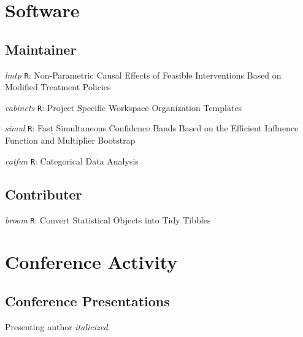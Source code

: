 \documentclass[12pt,letterpaper]{report}
\begin{document}
    \section*{Software}
    
    \subsection*{Maintainer}
    
    \begin{tablist}
    
    	\item[\textit{lmtp}] \tab \texttt{R}: Non-Parametric Causal Effects of Feasible Interventions Based on Modified Treatment Policies
	
	\item[\textit{cabinets}] \tab \texttt{R}: Project Specific Workspace Organization Templates
	
	\item[\textit{simul}] \tab \texttt{R}: Fast Simultaneous Confidence Bands Based on the Efficient Influence Function and Multiplier Bootstrap
	
	\item[\textit{catfun}] \tab \texttt{R}: Categorical Data Analysis
    
    \end{tablist}
    
    \subsection*{Contributer}
    
    \begin{tablist}
    
    	\item[\textit{broom}] \tab \texttt{R}: Convert Statistical Objects into Tidy Tibbles
    
    \end{tablist}

    \section*{Conference Activity}

    \subsection*{Conference Presentations}

    Presenting author \textit{italicized}. \bigskip
\end{document}

